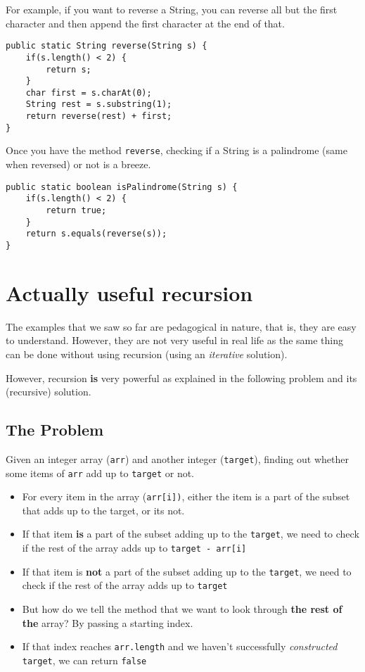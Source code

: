 For example, if you want to reverse a String, you can reverse all but the first character and then append the first character at the end of that.

\begin{lstlisting}
public static String reverse(String s) {
	if(s.length() < 2) {
		return s;
	}
	char first = s.charAt(0);
	String rest = s.substring(1);
	return reverse(rest) + first;
}
\end{lstlisting}

Once you have the method \texttt{reverse}, checking if a String is a palindrome (same when reversed) or not is a breeze.

\begin{lstlisting}
public static boolean isPalindrome(String s) {
	if(s.length() < 2) {
		return true;
	}
	return s.equals(reverse(s));
}
\end{lstlisting}
\section{Actually useful recursion}

The examples that we saw so far are pedagogical in nature, that is, they are easy to understand. However, they are not very useful in real life as the same thing can be done without using recursion (using an \textit{iterative} solution).

However, recursion \textbf{is} very powerful as explained in the following problem and its (recursive) solution.


\subsection{The Problem}

Given an integer array (\texttt{arr}) and another integer (\texttt{target}), finding out whether some items of \texttt{arr} add up to \texttt{target} or not.

\begin{itemize}
  \item For every item in the array (\texttt{arr[i])}, either the item is a part of the subset that adds up to the target, or its not.
  \item If that item \textbf{is} a part of the subset adding up to the \texttt{target}, we need to check if the rest of the array adds up to \texttt{target - arr[i]}
  \item If that item is \textbf{not} a part of the subset adding up to the \texttt{target}, we need to check if the rest of the array adds up to \texttt{target}
  \item But how do we tell the method that we want to look through \textbf{the rest of the} array? By passing a starting index.
  \item If that index reaches \texttt{arr.length} and we haven't successfully \textit{constructed} \texttt{target}, we can return \texttt{false}
\end{itemize}

